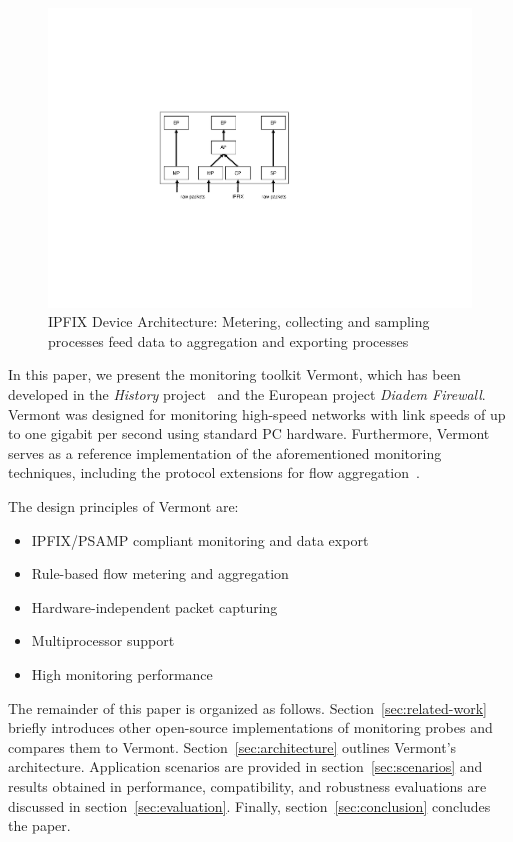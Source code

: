 \begin{figure}
\begin{center}
\includegraphics[scale=0.55]{gfx/ipfix-arch2.pdf}
\caption{IPFIX Device Architecture: Metering, collecting and sampling processes feed data to aggregation and exporting processes}
\label{fig_ipfix_arch}
\end{center}
\end{figure}


In this paper, we present the monitoring toolkit Vermont, which has been developed in the \emph{History} project~\cite{dressler2005history} and the European project \emph{Diadem Firewall}.
Vermont was designed for monitoring high-speed networks with link speeds of up to one gigabit per second using standard PC hardware.
Furthermore, Vermont serves as a reference implementation of the aforementioned monitoring techniques, including the protocol extensions for flow aggregation~\cite{dressler-ipfix-aggregation}.

The design principles of Vermont are:
\begin{itemize}
\item IPFIX/PSAMP compliant monitoring and data export
\item Rule-based flow metering and aggregation
\item Hardware-independent packet capturing
\item Multiprocessor support
\item High monitoring performance
\end{itemize}

The remainder of this paper is organized as follows.
Section~\ref{sec:related-work} briefly introduces other open-source implementations of monitoring probes and compares them to Vermont.
Section~\ref{sec:architecture} outlines Vermont's architecture.
Application scenarios are provided in section~\ref{sec:scenarios} and results obtained in performance, compatibility, and robustness evaluations are discussed in section~\ref{sec:evaluation}.
Finally, section~\ref{sec:conclusion} concludes the paper.
